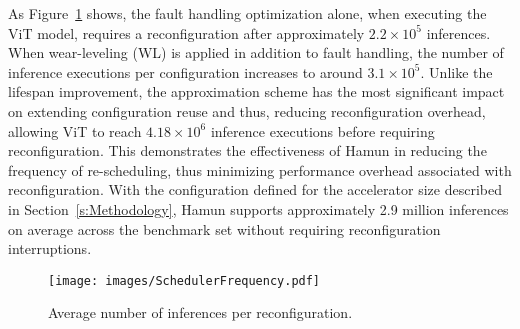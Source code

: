 As Figure~\ref{fig:Reconfiguration} shows, the fault handling optimization alone, when executing the ViT model, requires a reconfiguration after approximately $2.2 \times 10^{5}$ inferences. When wear-leveling (WL) is applied in addition to fault handling, the number of inference executions per configuration increases to around $3.1 \times 10^{5}$. Unlike the lifespan improvement, the approximation scheme has the most significant impact on extending configuration reuse and thus, reducing reconfiguration overhead, allowing ViT to reach $4.18 \times 10^{6}$ inference executions before requiring reconfiguration. This demonstrates the effectiveness of Hamun in reducing the frequency of re-scheduling, thus minimizing performance overhead associated with reconfiguration. With the configuration defined for the accelerator size described in Section~\ref{s:Methodology}, Hamun supports approximately 2.9 million inferences on average across the benchmark set without requiring reconfiguration interruptions.

\begin{figure}[t!]
    \centering
    \texttt{[image: images/SchedulerFrequency.pdf]}
    \vskip -0.05in
    \caption{Average number of inferences per reconfiguration.}
    \label{fig:Reconfiguration}
    \vskip -0.20in
\end{figure}
